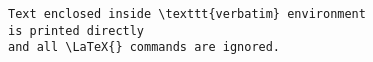\documentclass{article}
\begin{document}
\begin{verbatim}
Text enclosed inside \texttt{verbatim} environment 
is printed directly 
and all \LaTeX{} commands are ignored.
\end{verbatim}
\end{document}
